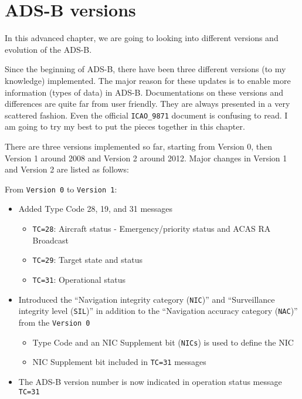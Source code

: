\section{ADS-B versions}\label{ads-b-versions}

In this advanced chapter, we are going to looking into different
versions and evolution of the ADS-B.

Since the beginning of ADS-B, there have been three different versions
(to my knowledge) implemented. The major reason for these updates is to
enable more information (types of data) in ADS-B. Documentations on
these versions and differences are quite far from user friendly. They
are always presented in a very scattered fashion. Even the official
\texttt{ICAO\_9871} document is confusing to read. I am going to try my
best to put the pieces together in this chapter.

There are three versions implemented so far, starting from Version 0,
then Version 1 around 2008 and Version 2 around 2012. Major changes in
Version 1 and Version 2 are listed as follows:

From \texttt{Version\ 0} to \texttt{Version\ 1}:

\begin{itemize}
\item
  Added Type Code 28, 19, and 31 messages

  \begin{itemize}
    \item
    \texttt{TC=28}: Aircraft status - Emergency/priority status and ACAS
    RA Broadcast
  \item
    \texttt{TC=29}: Target state and status
  \item
    \texttt{TC=31}: Operational status
  \end{itemize}
\item
  Introduced the ``Navigation integrity category (\texttt{NIC})'' and
  ``Surveillance integrity level (\texttt{SIL})'' in addition to the
  ``Navigation accuracy category (\texttt{NAC})'' from the
  \texttt{Version\ 0}

  \begin{itemize}
    \item
    Type Code and an NIC Supplement bit (\texttt{NICs}) is used to
    define the NIC
  \item
    NIC Supplement bit included in \texttt{TC=31} messages
  \end{itemize}
\item
  The ADS-B version number is now indicated in operation status message
  \texttt{TC=31}
\end{itemize}

